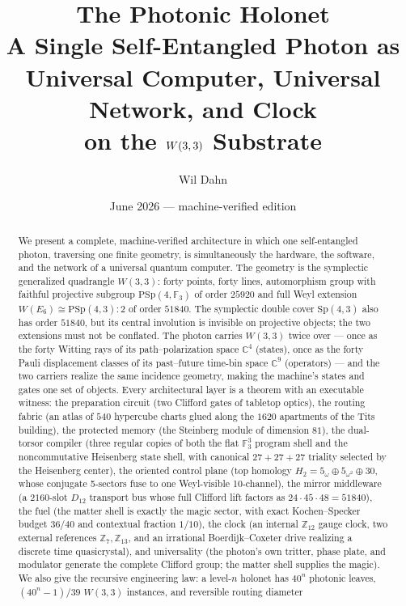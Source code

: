 \documentclass[11pt]{article}
\title{\textbf{The Photonic Holonet}\\[4pt]
\large A Single Self-Entangled Photon as Universal Computer,
Universal Network, and Clock\\ on the $\W$ Substrate}
\author{Wil Dahn}
\date{June 2026 --- machine-verified edition}
\newcommand{\W}{W(3,3)}
\newcommand{\GF}[1]{\mathbb{F}_{#1}}
\newcommand{\Sp}{\mathrm{Sp}}
\newcommand{\PSp}{\mathrm{PSp}}
\begin{document}
\maketitle

\begin{abstract}
We present a complete, machine-verified architecture in which one
self-entangled photon, traversing one finite geometry, is
simultaneously the hardware, the software, and the network of a
universal quantum computer.  The geometry is the symplectic generalized
quadrangle $\W$: forty points, forty lines, automorphism group
with faithful projective subgroup $\PSp(4,\GF3)$ of order $25920$ and
full Weyl extension $W(E_6)\cong\PSp(4,3){:}2$ of order $51840$.
The symplectic double cover $\Sp(4,3)$ also has order $51840$, but its
central involution is invisible on projective objects; the two
extensions must not be conflated.  The photon carries $\W$ twice over ---
once as the forty Witting rays of its path--polarization space
$\mathbb{C}^4$ (states), once as the forty Pauli displacement classes of
its past--future time-bin space $\mathbb{C}^9$ (operators) --- and the
two carriers realize the same incidence geometry, making the machine's
states and gates one set of objects.  Every architectural layer is a
theorem with an executable witness: the preparation circuit (two
Clifford gates of tabletop optics), the routing fabric (an atlas of
$540$ hypercube charts glued along the $1620$ apartments of the Tits
building), the protected memory (the Steinberg module of dimension
$81$), the dual-torsor compiler (three regular copies of both the flat
$\GF3^3$ program shell and the noncommutative Heisenberg state shell,
with canonical $27+27+27$ triality selected by the Heisenberg center),
the oriented control plane (top homology
$H_2=5_{\omega}\oplus5_{\omega^2}\oplus30$, whose conjugate
5-sectors fuse to one Weyl-visible 10-channel),
the mirror middleware (a $2160$-slot $D_{12}$ transport bus whose
full Clifford lift factors as $24\cdot45\cdot48=51840$), the fuel (the
matter shell is exactly the magic sector, with exact Kochen--Specker
budget $36/40$ and contextual fraction $1/10$), the clock (an internal
$\mathbb{Z}_{12}$ gauge clock, two external references
$\mathbb{Z}_7,\mathbb{Z}_{13}$, and an irrational Boerdijk--Coxeter
drive realizing a discrete time quasicrystal), and universality (the
photon's own tritter, phase plate, and modulator generate the complete
Clifford group; the matter shell supplies the magic).  We also give the
recursive engineering law: a level-$n$ holonet has $40^n$ photonic
leaves, $(40^n-1)/39$ $\W$ instances, and reversible routing diameter

\end{abstract}
\end{document}

